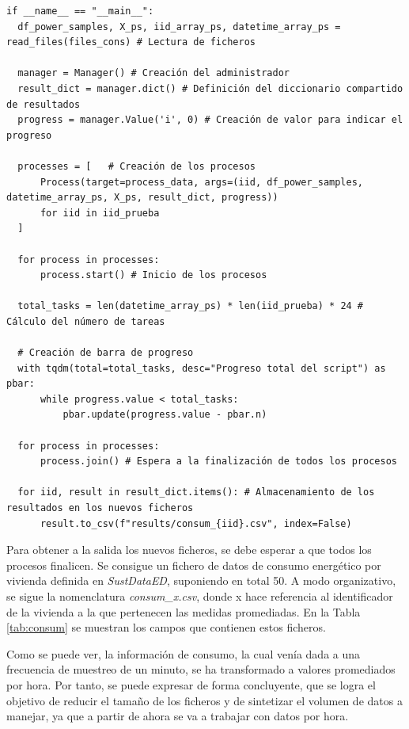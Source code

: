 \begin{lstlisting}[style=Python, caption={Creación de procesos}]
  if __name__ == "__main__":
  df_power_samples, X_ps, iid_array_ps, datetime_array_ps = read_files(files_cons) # Lectura de ficheros

  manager = Manager() # Creación del administrador
  result_dict = manager.dict() # Definición del diccionario compartido de resultados
  progress = manager.Value('i', 0) # Creación de valor para indicar el progreso

  processes = [   # Creación de los procesos
      Process(target=process_data, args=(iid, df_power_samples, datetime_array_ps, X_ps, result_dict, progress))
      for iid in iid_prueba
  ]

  for process in processes: 
      process.start() # Inicio de los procesos

  total_tasks = len(datetime_array_ps) * len(iid_prueba) * 24 # Cálculo del número de tareas

  # Creación de barra de progreso
  with tqdm(total=total_tasks, desc="Progreso total del script") as pbar:
      while progress.value < total_tasks:
          pbar.update(progress.value - pbar.n)

  for process in processes:
      process.join() # Espera a la finalización de todos los procesos

  for iid, result in result_dict.items(): # Almacenamiento de los resultados en los nuevos ficheros
      result.to_csv(f"results/consum_{iid}.csv", index=False) 
\end{lstlisting}

\vspace{3mm}

Para obtener a la salida los nuevos ficheros, se debe esperar a que todos los procesos finalicen. Se consigue un fichero de datos de consumo energético por vivienda definida en \textit{SustDataED}, suponiendo en total 50. A modo organizativo, se sigue la nomenclatura \textit{consum\_x.csv}, donde x hace referencia al identificador de la vivienda a la que pertenecen las medidas promediadas. En la Tabla \ref{tab:consum} se muestran los campos que contienen estos ficheros.

\vspace{3mm}

Como se puede ver, la información de consumo, la cual venía dada a una frecuencia de muestreo de un minuto, se ha transformado a valores promediados por hora. Por tanto, se puede expresar de forma concluyente, que se logra el objetivo de reducir el tamaño de los ficheros y de sintetizar el volumen de datos a manejar, ya que a partir de ahora se va a trabajar con datos por hora.

